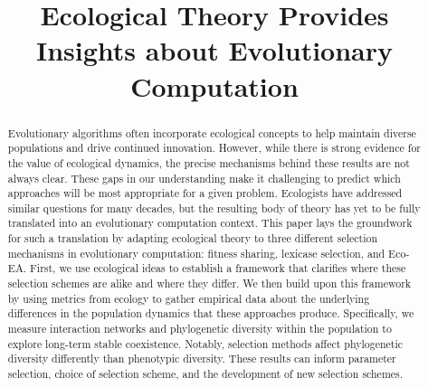\documentclass[sigconf]{acmart}
\begin{document}
\title{Ecological Theory Provides Insights about Evolutionary Computation}







\begin{abstract}
Evolutionary algorithms often incorporate ecological concepts to help maintain diverse populations and drive continued innovation. However, while there is strong evidence for the value of ecological dynamics, the precise mechanisms behind these results are not always clear. These gaps in our understanding make it challenging to predict which approaches will be most appropriate for a given problem. Ecologists have addressed similar questions for many decades, but the resulting body of theory has yet to be fully translated into an evolutionary computation context. This paper lays the groundwork for such a translation by adapting ecological theory to three different selection mechanisms in evolutionary computation: fitness sharing, lexicase selection, and Eco-EA. First, we use ecological ideas to establish a framework that clarifies where these selection schemes are alike and where they differ. We then build upon this framework by using metrics from ecology to gather empirical data about the underlying differences in the population dynamics that these approaches produce. Specifically, we measure interaction networks and phylogenetic diversity within the population to explore long-term stable coexistence. Notably, selection methods affect phylogenetic diversity differently than phenotypic diversity. These results can inform parameter selection, choice of selection scheme, and the development of new selection schemes.

\end{abstract}
\end{document}
